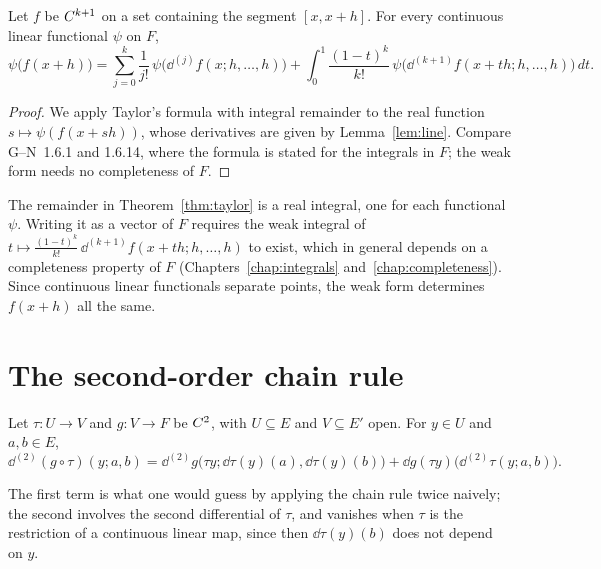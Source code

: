 \begin{theorem}
  \label{thm:taylor}
  \leanok
  Let $f$ be $C^{k+1}$ on a set containing the segment $[x, x+h]$. For every continuous linear
  functional $\psi$ on $F$,
  \[
    \psi\bigl(f(x + h)\bigr) = \sum_{j=0}^{k} \frac{1}{j!}\,
      \psi\bigl(\dd^{(j)} f(x; h, \dots, h)\bigr)
      + \int_0^1 \frac{(1-t)^k}{k!}\,
      \psi\bigl(\dd^{(k+1)} f(x + th; h, \dots, h)\bigr)\, dt .
  \]
\end{theorem}

\begin{proof}
  \leanok
  We apply Taylor's formula with integral remainder to the real function
  $s \mapsto \psi(f(x + sh))$, whose derivatives are given by Lemma~\ref{lem:line}. Compare
  G--N~1.6.1 and 1.6.14, where the formula is stated for the integrals in $F$; the weak form
  needs no completeness of $F$.
\end{proof}

\begin{remark}
  The remainder in Theorem~\ref{thm:taylor} is a real integral, one for each functional $\psi$.
  Writing it as a vector of $F$ requires the weak integral of
  $t \mapsto \frac{(1-t)^k}{k!}\,\dd^{(k+1)} f(x + th; h, \dots, h)$ to exist, which in general
  depends on a completeness property of $F$ (Chapters~\ref{chap:integrals}
  and~\ref{chap:completeness}). Since continuous linear functionals separate points, the weak
  form determines $f(x + h)$ all the same.
\end{remark}

\section{The second-order chain rule}

\begin{theorem}
  \label{thm:chain-second}
  \leanok
  Let $\tau \colon U \to V$ and $g \colon V \to F$ be $C^{2}$, with $U \subseteq E$ and
  $V \subseteq E'$ open. For $y \in U$ and $a, b \in E$,
  \[
    \dd^{(2)} (g \circ \tau)(y; a, b)
      = \dd^{(2)} g\bigl(\tau y; \dd\tau(y)(a), \dd\tau(y)(b)\bigr)
        + \dd g(\tau y)\bigl(\dd^{(2)} \tau(y; a, b)\bigr).
  \]
\end{theorem}

The first term is what one would guess by applying the chain rule twice naively; the second
involves the second differential of $\tau$, and vanishes when $\tau$ is the restriction of a continuous
linear map, since then $\dd\tau(y)(b)$ does not depend on $y$.

